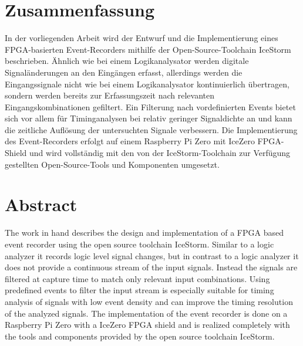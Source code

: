 \documentclass[oneside]{wissdoc}
\newcommand{\blankpage}{%
 \clearpage{\pagestyle{empty}\cleardoublepage}
}
\begin{document}



%

\section*{Zusammenfassung}

In der vorliegenden Arbeit wird der Entwurf und die Implementierung eines FPGA-basierten Event-Recorders mithilfe der Open-Source-Toolchain IceStorm beschrieben. Ähnlich wie bei einem Logikanalysator werden digitale Signaländerungen an den Eingängen erfasst, allerdings werden die Eingangssignale nicht wie bei einem Logikanalysator kontinuierlich übertragen, sondern werden bereits zur Erfassungszeit nach relevanten Eingangskombinationen gefiltert. Ein Filterung nach vordefinierten Events bietet sich vor allem für Timinganalysen bei relativ geringer Signaldichte an und kann die zeitliche Auflösung der untersuchten Signale verbessern.
Die Implementierung des Event-Recorders erfolgt auf einem Raspberry Pi Zero mit IceZero FPGA-Shield und wird vollständig mit den von der IceStorm-Toolchain zur Verfügung gestellten Open-Source-Tools und Komponenten umgesetzt.   

\section*{Abstract}

The work in hand describes the design and implementation of a FPGA based event recorder using the open source toolchain IceStorm. 
Similar to a logic analyzer it records logic level signal changes, but in contrast to a logic analyzer it does not provide a continuous stream of the input signals. Instead the signals are filtered at capture time to match only relevant input combinations. Using predefined events to filter the input stream is especially suitable for timing analysis of signals with low event density and can improve the timing resolution of the analyzed signals.
The implementation of the event recorder is done on a Raspberry Pi Zero with a IceZero FPGA shield and is realized completely with the tools and components provided by the open source toolchain IceStorm.   


\ifnotdraft{
\tableofcontents
}
\end{document}
